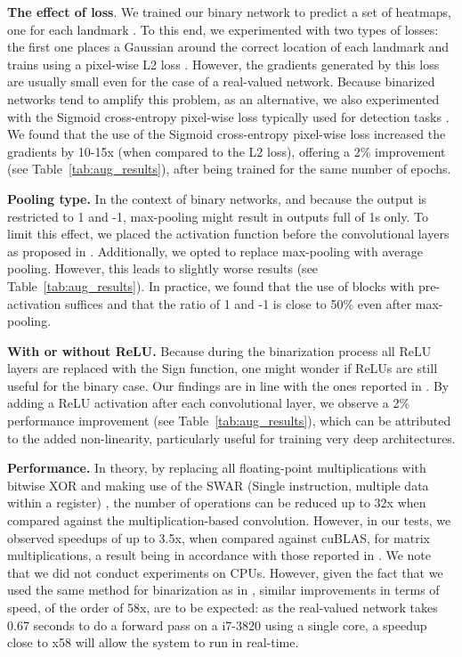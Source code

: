 \documentclass[10pt,journal,compsoc]{IEEEtran}
\begin{document}
\textbf{The effect of loss}. We trained our binary network to predict a set of heatmaps, one for each landmark \cite{tompson2014joint}. To this end, we experimented with two types of losses: the first one places a Gaussian around the correct location of each landmark and trains using a pixel-wise L2 loss \cite{tompson2014joint}. However, the gradients generated by this loss are usually small even for the case of a real-valued network. Because binarized networks tend to amplify this problem, as an alternative, we also experimented with the Sigmoid cross-entropy pixel-wise loss typically used for detection tasks \cite{zhang2015fine}. We found that the use of the Sigmoid cross-entropy pixel-wise loss increased the gradients by 10-15x (when compared to the L2 loss), offering a 2\% improvement (see Table~\ref{tab:aug_results}), after being trained for the same number of epochs.
 
\textbf{Pooling type.} In the context of binary networks, and because the output is restricted to 1 and -1, max-pooling might result in outputs full of 1s only. To limit this effect, we placed the activation function before the convolutional layers as proposed in \cite{he2016identity,rastegari2016xnor}. Additionally, we opted to replace max-pooling with average pooling. However, this leads to slightly worse results (see Table~\ref{tab:aug_results}). In practice, we found that the use of blocks with pre-activation suffices and that the ratio of 1 and -1 is close to 50\% even after max-pooling.

\textbf{With or without ReLU.} Because during the binarization process all ReLU layers are replaced with the Sign function, one might wonder if ReLUs are still useful for the binary case. Our findings are in line with the ones reported in \cite{rastegari2016xnor}. By adding a ReLU activation after each convolutional layer, we observe a 2\% performance improvement (see Table~\ref{tab:aug_results}), which can be attributed to the added non-linearity, particularly useful for training very deep architectures.

\textbf{Performance.} In theory, by replacing all floating-point multiplications with bitwise XOR and making use of the SWAR (Single instruction, multiple data within a register) \cite{rastegari2016xnor,courbariaux2016binarized}, the number of operations can be reduced up to 32x when compared against the multiplication-based convolution. However, in our tests, we observed speedups of up to 3.5x, when compared against cuBLAS, for matrix multiplications, a result being in accordance with those reported in \cite{courbariaux2016binarized}. We note that we did not conduct experiments on CPUs. However, given the fact that we used the same method for binarization as in \cite{rastegari2016xnor}, similar improvements in terms of speed, of the order of 58x, are to be expected: as the real-valued network takes 0.67 seconds to do a forward pass on a i7-3820 using a single core, a speedup close to x58 will allow the system to run in real-time.
\end{document}
